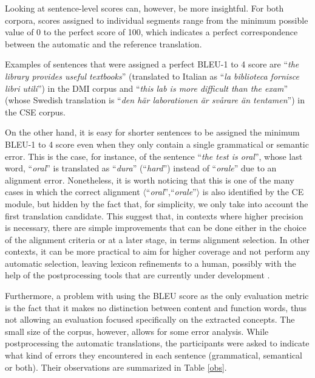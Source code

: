 \documentclass[11pt]{article}
\begin{document}
Looking at sentence-level scores can, however, be more insightful. 
For both corpora, scores assigned to individual segments range from the minimum possible value of 0 to the perfect score of 100, which indicates a perfect correspondence between the automatic and the reference translation.

Examples of sentences that were assigned a perfect BLEU-1 to 4 score are ``\textit{the library provides useful textbooks}'' (translated to Italian as ``\textit{la biblioteca fornisce libri utili}'') in the DMI corpus and ``\textit{this lab is more difficult than the exam}'' (whose Swedish translation is ``\textit{den här laborationen är svårare än tentamen}'') in the CSE corpus. \smallskip

On the other hand, it is easy for shorter sentences to be assigned the minimum BLEU-1 to 4 score even when they only contain a single grammatical or semantic error. 
This is the case, for instance, of the sentence ``\textit{the test is oral}'', whose last word, ``\textit{oral}'' is translated as ``\textit{dura}'' (``\textit{hard}'') instead of ``\textit{orale}'' due to an alignment error. 
Nonetheless, it is worth noticing that this is one of the many cases in which the correct alignment $\langle$``\textit{oral}'',``\textit{orale}''$\rangle$ is also identified by the CE module, but hidden by the fact that, for simplicity, we only take into account the first translation candidate.
This suggest that, in contexts where higher precision is necessary, there are simple improvements that can be done either in the choice of the alignment criteria or at a later stage, in terms alignment selection. 
In other contexts, it can be more practical to aim for higher coverage and not perform any automatic selection, leaving lexicon refinements to a human, possibly with the help of the postprocessing tools that are currently under development \cite{dummy}.

Furthermore, a problem with using the BLEU score as the only evaluation metric is the fact that it makes no distinction between content and function words, thus not allowing an evaluation focused specifically on the extracted concepts. 
The small size of the corpus, however, allows for some error analysis. 
While postprocessing the automatic translations, the participants were asked to indicate what kind of errors they encountered in each sentence (grammatical, semantical or both). 
Their observations are summarized in Table \ref{obs}.
\end{document}

